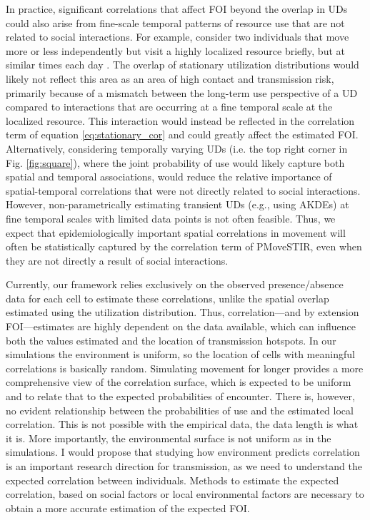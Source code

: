 \documentclass[letterpaper]{article}
\begin{document}
In practice, significant correlations that affect FOI beyond the overlap in UDs could also arise from fine-scale temporal patterns of resource use that are not related to social interactions.  For example, consider two individuals that move more or less independently but visit a highly localized resource briefly, but at similar times each day \citep[e.g., visiting a watering hole at similar times every day][]{VanderWaal2017}. The overlap of stationary utilization distributions would likely not reflect this area as an area of high contact and transmission risk, primarily because of a mismatch between the long-term use perspective of a UD compared to interactions that are occurring at a fine temporal scale at the localized resource.  This interaction would instead be reflected in the correlation term of equation \ref{eq:stationary_cor} and could greatly affect the estimated FOI.  Alternatively, considering temporally varying UDs (i.e. the top right corner in Fig. \ref{fig:square}), where the joint probability of use would likely capture both spatial and temporal associations, would reduce the relative importance of spatial-temporal correlations that were not directly related to social interactions. However, non-parametrically estimating transient UDs (e.g., using AKDEs) at fine temporal scales with limited data points is not often feasible.  Thus, we expect that epidemiologically important spatial correlations in movement will often be statistically captured by the correlation term of PMoveSTIR, even when they are not directly a result of social interactions.

Currently, our framework relies exclusively on the observed presence/absence data for each cell to estimate these correlations, unlike the spatial overlap estimated using the utilization distribution. Thus, correlation---and by extension FOI---estimates are highly dependent on the data available, which can influence both the values estimated and the location of transmission hotspots. In our simulations the environment is uniform, so the location of cells with meaningful correlations is basically random. Simulating movement for longer provides a more comprehensive view of the correlation surface, which is expected to be uniform and to relate that to the expected probabilities of encounter. There is, however, no evident relationship between the probabilities of use and the estimated local correlation. 
This is not possible with the empirical data, the data length is what it is. More importantly, the environmental surface is not uniform as in the simulations. I would propose that studying how environment predicts correlation is an important research direction for transmission, as we need to understand the expected correlation between individuals. 
Methods to estimate the expected correlation, based on social factors or local environmental factors are necessary to obtain a more accurate estimation of the expected FOI.
\end{document}
